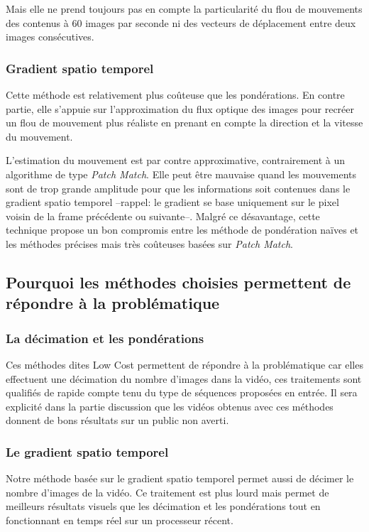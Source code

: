 \documentclass[fleqn,10pt]{SelfArx} %
\begin{document}
Mais elle ne prend toujours pas en compte la particularité du flou de mouvements des contenus à 60 images par seconde ni des vecteurs de déplacement entre deux images consécutives.

\subsubsection{Gradient spatio temporel}
Cette méthode est relativement plus coûteuse que les pondérations. En contre partie, elle s'appuie sur
l'approximation du flux optique des images pour recréer un flou de mouvement plus réaliste en prenant en
compte la direction et la vitesse du mouvement.

L'estimation du mouvement est par contre approximative, contrairement à un algorithme de type {\em Patch Match}.
Elle peut être mauvaise quand les mouvements sont de trop grande amplitude pour que les informations soit contenues dans 
le gradient spatio temporel --rappel: le gradient se base uniquement sur le pixel voisin de la frame précédente
ou suivante--. Malgré ce désavantage, cette technique propose un bon compromis entre les méthode de
pondération naïves et les méthodes précises mais très coûteuses basées sur {\em Patch Match}.

\subsection{Pourquoi les méthodes choisies permettent de répondre à la problématique}

\subsubsection{La décimation et les pondérations}
Ces méthodes dites \og Low Cost \fg{} permettent de répondre à la problématique car elles effectuent une décimation du nombre d'images dans la vidéo, ces traitements sont qualifiés de rapide compte tenu du type de séquences proposées en entrée. Il sera explicité dans la partie discussion que les vidéos obtenus avec ces méthodes donnent de bons résultats sur un public non averti.

\subsubsection{Le gradient spatio temporel}
Notre méthode basée sur le gradient spatio temporel permet aussi de décimer le nombre d'images de la vidéo. 
Ce traitement est plus lourd mais permet de meilleurs résultats visuels que les décimation et les pondérations
tout en fonctionnant en temps réel sur un processeur récent.
\end{document}

